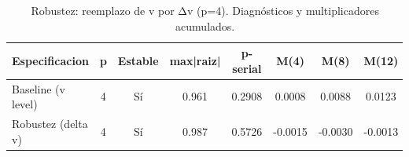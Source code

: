 \begin{table}[htbp]
\centering
\caption{Robustez: reemplazo de v por Δv (p=4). Diagnósticos y multiplicadores acumulados.}
\label{tab:delta_v_robustness}
\footnotesize
\begin{tabular}{lccccccc}
\toprule
Especificacion & p & Estable & max|raiz| & p-serial & M(4) & M(8) & M(12) \\
\midrule
Baseline (v level) & 4 & Sí & 0.961 & 0.2908 & 0.0008 & 0.0088 & 0.0123 \\
Robustez (delta v) & 4 & Sí & 0.987 & 0.5726 & -0.0015 & -0.0030 & -0.0013 \\
\bottomrule
\end{tabular}
\end{table}

